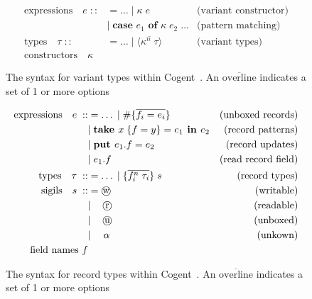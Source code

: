 \begin{figure}
    \centering

    \begin{align*}
        \text{expressions}\quad e\; 
            ::&= \dots\; |\; \kappa\; e & \text{(variant constructor)} \\
              &|\; \textbf{case } e_1 \textbf{ of } \kappa\; e_2\; \dots & \text{(pattern matching)} \\
        \text{types}\quad \tau\;
            ::&= \dots\; |\; \langle \overline{\kappa^n\; \tau} \rangle & \text{(variant types)} \\
        \text{constructors}\quad \kappa
    \end{align*}

    \caption{The syntax for variant types within Cogent~\citep{ICFPCogent}. An $\overline{\text{overline}}$ indicates a set of 1 or more options}
    \label{fig:variantGrammar}
\end{figure}

\begin{figure}
    \centering
    \begin{align*}
        \text{expressions}\quad e\; 
            ::&= \dots\; |\; \#\{\overline{f_i = e_i}\} & \text{(unboxed records)} \\
              &|\; \textbf{take } x\; \{ f = y\} = e_1 \textbf{ in } e_2 & \text{(record patterns)} \\
              &|\; \textbf{put } e_1.f = e_2 & \text{(record updates)} \\
              &|\; e_1.f & \text{(read record field)} \\
        \text{types}\quad \tau\;
            ::&= \dots\; |\; \{ \overline{f_i^n\; \tau_i} \}\; s & \text{(record types)} \\
        \text{sigils}\quad s\;
            ::&= \text{\textcircled{w}} & \text{(writable)} \\
            &|\quad\, \text{\textcircled{r}} & \text{(readable)}\\
            &|\quad\, \text{\textcircled{u}} & \text{(unboxed)}\\
            &|\quad\; \alpha & \text{(unkown)}\\
        \text{field names } f
    \end{align*}
    \caption{The syntax for record types within Cogent~\citep{ICFPCogent}. An $\overline{\text{overline}}$ indicates a set of 1 or more options}
    \label{fig:recordGrammar}
\end{figure}



